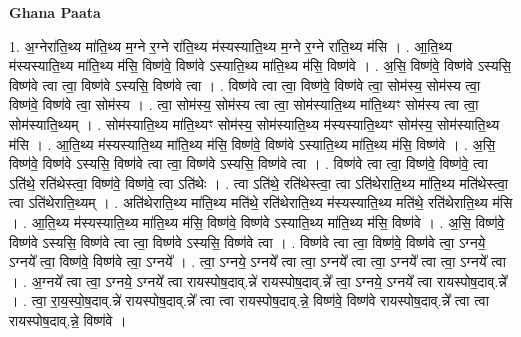 \documentclass[17pt]{extarticle}
\begin{document}
\textbf{Ghana Paata } \newline

1. अ॒ग्नेरा॑ति॒थ्य मा॑ति॒थ्य म॒ग्ने र॒ग्ने रा॑ति॒थ्य म॑स्यस्याति॒थ्य म॒ग्ने र॒ग्ने रा॑ति॒थ्य म॑सि । . आ॒ति॒थ्य म॑स्यस्याति॒थ्य मा॑ति॒थ्य म॑सि॒ विष्ण॑वे॒ विष्ण॑वे ऽस्याति॒थ्य मा॑ति॒थ्य म॑सि॒ विष्ण॑वे । . अ॒सि॒ विष्ण॑वे॒ विष्ण॑वे ऽस्यसि॒ विष्ण॑वे त्वा त्वा॒ विष्ण॑वे ऽस्यसि॒ विष्ण॑वे त्वा । . विष्ण॑वे त्वा त्वा॒ विष्ण॑वे॒ विष्ण॑वे त्वा॒ सोम॑स्य॒ सोम॑स्य त्वा॒ विष्ण॑वे॒ विष्ण॑वे त्वा॒ सोम॑स्य । . त्वा॒ सोम॑स्य॒ सोम॑स्य त्वा त्वा॒ सोम॑स्याति॒थ्य मा॑ति॒थ्यꣳ सोम॑स्य त्वा त्वा॒ सोम॑स्याति॒थ्यम् । . सोम॑स्याति॒थ्य मा॑ति॒थ्यꣳ सोम॑स्य॒ सोम॑स्याति॒थ्य म॑स्यस्याति॒थ्यꣳ सोम॑स्य॒ सोम॑स्याति॒थ्य म॑सि । . आ॒ति॒थ्य म॑स्यस्याति॒थ्य मा॑ति॒थ्य म॑सि॒ विष्ण॑वे॒ विष्ण॑वे ऽस्याति॒थ्य मा॑ति॒थ्य म॑सि॒ विष्ण॑वे । . अ॒सि॒ विष्ण॑वे॒ विष्ण॑वे ऽस्यसि॒ विष्ण॑वे त्वा त्वा॒ विष्ण॑वे ऽस्यसि॒ विष्ण॑वे त्वा । . विष्ण॑वे त्वा त्वा॒ विष्ण॑वे॒ विष्ण॑वे॒ त्वा ऽति॑थे॒ रति॑थेस्त्वा॒ विष्ण॑वे॒ विष्ण॑वे॒ त्वा ऽति॑थेः । . त्वा ऽति॑थे॒ रति॑थेस्त्वा॒ त्वा ऽति॑थेराति॒थ्य मा॑ति॒थ्य मति॑थेस्त्वा॒ त्वा ऽति॑थेराति॒थ्यम् । . अति॑थेराति॒थ्य मा॑ति॒थ्य मति॑थे॒ रति॑थेराति॒थ्य म॑स्यस्याति॒थ्य मति॑थे॒ रति॑थेराति॒थ्य म॑सि । . आ॒ति॒थ्य म॑स्यस्याति॒थ्य मा॑ति॒थ्य म॑सि॒ विष्ण॑वे॒ विष्ण॑वे ऽस्याति॒थ्य मा॑ति॒थ्य म॑सि॒ विष्ण॑वे । . अ॒सि॒ विष्ण॑वे॒ विष्ण॑वे ऽस्यसि॒ विष्ण॑वे त्वा त्वा॒ विष्ण॑वे ऽस्यसि॒ विष्ण॑वे त्वा । . विष्ण॑वे त्वा त्वा॒ विष्ण॑वे॒ विष्ण॑वे त्वा॒ ऽग्नये॒ ऽग्नये᳚ त्वा॒ विष्ण॑वे॒ विष्ण॑वे त्वा॒ ऽग्नये᳚ । . त्वा॒ ऽग्नये॒ ऽग्नये᳚ त्वा त्वा॒ ऽग्नये᳚ त्वा त्वा॒ ऽग्नये᳚ त्वा त्वा॒ ऽग्नये᳚ त्वा । . अ॒ग्नये᳚ त्वा त्वा॒ ऽग्नये॒ ऽग्नये᳚ त्वा रायस्पोष॒दाव्.न्ने॑ रायस्पोष॒दाव्.न्ने᳚ त्वा॒ ऽग्नये॒ ऽग्नये᳚ त्वा रायस्पोष॒दाव्.न्ने᳚ । . त्वा॒ रा॒य॒स्पो॒ष॒दाव्.न्ने॑ रायस्पोष॒दाव्.न्ने᳚ त्वा त्वा रायस्पोष॒दाव्.न्ने॒ विष्ण॑वे॒ विष्ण॑वे रायस्पोष॒दाव्.न्ने᳚ त्वा त्वा रायस्पोष॒दाव्.न्ने॒ विष्ण॑वे । \newline
\end{document}
